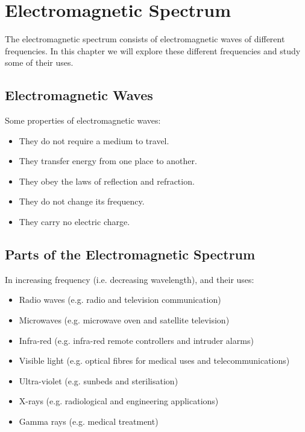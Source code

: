 \documentclass[../main.tex]{subfiles}
\begin{document}
	\section{Electromagnetic Spectrum}
	\begin{preamb}
		The electromagnetic spectrum consists of electromagnetic waves of different frequencies. In this chapter we will explore these different frequencies and study some of their uses.
	\end{preamb}

	\subsection{Electromagnetic Waves}
	Some properties of electromagnetic waves:
	\begin{itemize}
		\item They do not require a medium to travel.
		\item They transfer energy from one place to another.
		\item They obey the laws of reflection and refraction.
		\item They do not change its frequency.
		\item They carry no electric charge.
	\end{itemize}
	
	\subsection{Parts of the Electromagnetic Spectrum}
	In increasing frequency (i.e. decreasing wavelength), and their uses:
	\begin{itemize}
		\item Radio waves (e.g. radio and television communication)
		\item Microwaves (e.g. microwave oven and satellite television)
		\item Infra-red (e.g. infra-red remote controllers and intruder alarms)
		\item Visible light (e.g. optical fibres for medical uses and telecommunications)
		\item Ultra-violet (e.g. sunbeds and sterilisation)
		\item X-rays (e.g. radiological and engineering applications)
		\item Gamma rays (e.g. medical treatment)
	\end{itemize}
	
\end{document}
